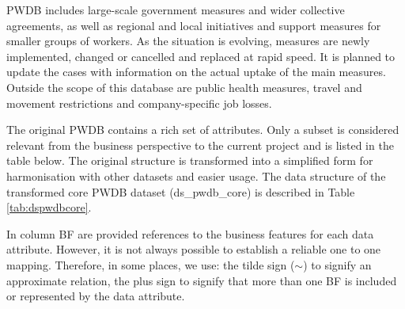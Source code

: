PWDB includes large-scale government measures and wider collective agreements, as well as regional and local initiatives and support measures for smaller groups of workers. As the situation is evolving, measures are newly implemented, changed or cancelled and replaced at rapid speed. It is planned to update the cases with information on the actual uptake of the main measures. Outside the scope of this database are public health measures, travel and movement restrictions and company-specific job losses. 

The original PWDB contains a rich set of attributes. Only a subset is considered relevant from the business perspective to the current project and is listed in the table below. The original structure is transformed into a simplified form for harmonisation with other datasets and easier usage. The data structure of the transformed core PWDB dataset (ds\_pwdb\_core) is described in Table \ref{tab:dspwdbcore}.

In column BF are provided references to the business features for each data attribute. However, it is not always possible to establish a reliable one to one mapping. Therefore, in some places, we use: the tilde sign ($\sim$) to signify an approximate relation, the plus sign to signify that more than one BF is included or represented by the data attribute.

